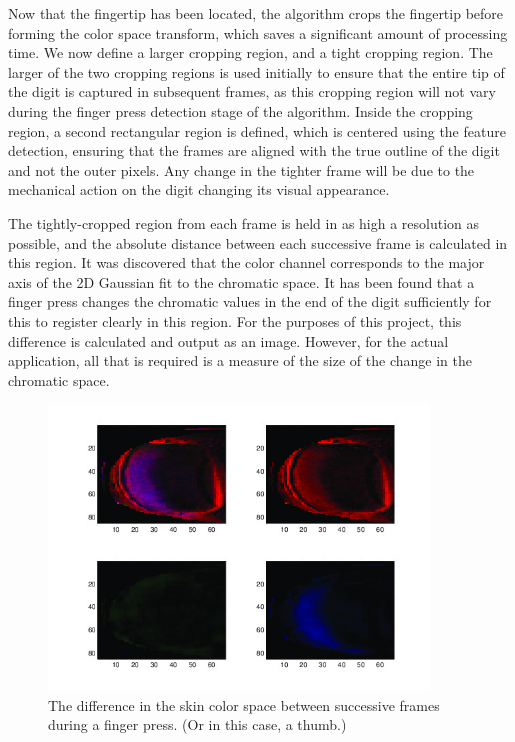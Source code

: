 Now that the fingertip has been located, the algorithm crops the fingertip before forming the color space transform, which saves a significant amount of processing time. We now define a larger cropping region, and a tight cropping region. The larger of the two cropping regions is used initially to ensure that the entire tip of the digit is captured in subsequent frames, as this cropping region will not vary during the finger press detection stage of the algorithm. Inside the cropping region, a second rectangular region is defined, which is centered using the feature detection, ensuring that the frames are aligned with the true outline of the digit and not the outer pixels. Any change in the tighter frame will be due to the mechanical action on the digit changing its visual appearance.

The tightly-cropped region from each frame is held in as high a resolution as possible, and the absolute distance between each successive frame is calculated in this region. It was discovered that the color channel corresponds to the major axis of the 2D Gaussian fit to the chromatic space. It has been found that a finger press changes the chromatic values in the end of the digit sufficiently for this to register clearly in this region. For the purposes of this project, this difference is calculated and output as an image. However, for the actual application, all that is required is a measure of the size of the change in the chromatic space.

\begin{figure}[h!]
  \centering
    \includegraphics[width=0.90\textwidth]{Chapter4/Figs/jThumb_Final_Proof.jpg}
    \caption{The difference in the skin color space between successive frames during a finger press. (Or in this case, a thumb.)}\label{fig:FinalProof}
\end{figure}

